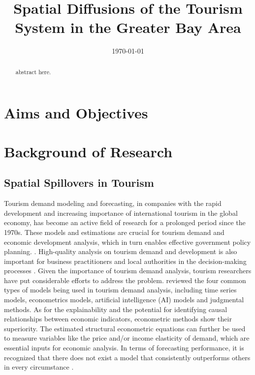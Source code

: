 \documentclass[11pt,a4paper]{amsart}
\theoremstyle{plain}
\theoremstyle{definition}
\begin{document}
\title{Spatial Diffusions of the Tourism System in the Greater Bay Area}
\date{\today}

\begin{abstract}
	abstract here.
\end{abstract}

\maketitle
\tableofcontents
\newpage


\section{Aims and Objectives}

\section{Background of Research}
\subsection{Spatial Spillovers in Tourism}\hfill\par
\noindent Tourism demand modeling and forecasting, in companies with the rapid development and increasing importance of international tourism in the global economy, has become an active field of research for a prolonged period since the 1970s. These models and estimations are crucial for tourism demand and economic development analysis, which in turn enables effective government policy planning. \parencite{jiaoTourismForecastingReview2019}. High-quality analysis on tourism demand and development is also important for business practitioners and local authorities in the decision-making processes \parencite{pengMetaAnalysisInternationalTourism2015}. Given the importance of tourism demand analysis, tourism researchers have put considerable efforts to address the problem. \textcite{songReviewResearchTourism2019} reviewed the four common types of models being used in tourism demand analysis, including time series models, econometrics models, artificial intelligence (AI) models and judgmental methods. As for the explainability and the potential for identifying causal relationships between economic indicators, econometric methods show their superiority. The estimated structural econometric equations can further be used to measure variables like the price and/or income elasticity of demand, which are essential inputs for economic analysis. In terms of forecasting performance, it is recognized that there does not exist a model that consistently outperforms others in every circumstance \parencite{liRecentDevelopmentsEconometric2005, wuNewDevelopmentsTourism2017}. 
\end{document}
